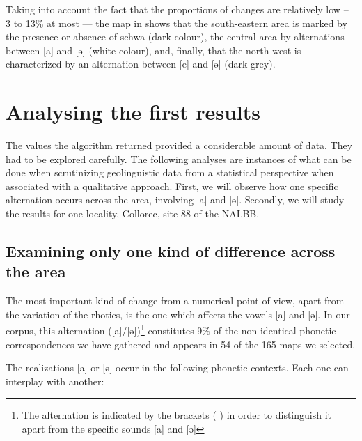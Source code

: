 \documentclass[output=paper]{LSP/langsci}
\begin{document}
Taking into account the fact that the proportions of changes are relatively low – 3 to 13\% at most — the map in  shows that the south-eastern area is marked by the presence or absence of schwa (dark colour), the central area by alternations between [a] and [ə] (white colour), and, finally, that the north-west is characterized by an alternation between [e] and [ə] (dark grey).

\section{Analysing the first results }

The values the algorithm returned provided a considerable amount of data. They had to be explored carefully. The following analyses are instances of what can be done when scrutinizing geolinguistic data from a statistical perspective when associated with a qualitative approach. First, we will observe how one specific alternation occurs across the area, involving [a] and [ə]. Secondly, we will study the results for one locality, Collorec, site 88 of the NALBB.

\subsection[Examining only one kind of difference across the area ]{Examining only one kind of difference across the area }

The most important kind of change from a numerical point of view, apart from the variation of the rhotics, is the one which affects the vowels [a] and [ə]. In our corpus, this alternation ([a]/[ə])\footnote{ The alternation is indicated by the brackets ( ) in order to distinguish it apart from the specific sounds [a] and [ə]} constitutes 9\% of the non-identical phonetic correspondences we have gathered and appears in 54 of the 165 maps we selected.

The realizations [a] or [ə] occur in the following phonetic contexts. Each one can interplay with another:
\end{document}
